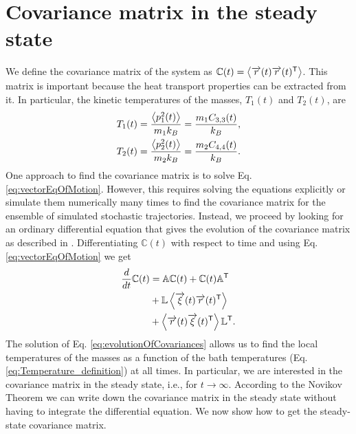 \section{Covariance matrix in the steady state\label{sec:covMatrix}}
%
%
%
%
%
%
We define the covariance matrix of the system as $\mathbb{C}(t) = \expval{\overrightarrow{r}(t)\overrightarrow{r}(t)^\mathsf{T}}$. This matrix is important because the heat transport properties can be extracted from it. In particular, the kinetic temperatures of the masses, $T_1(t)$ and  $T_2(t)$, are
%
\begin{align}
  T_1(t) &= \frac{\expval{ p_1^2(t)}}{m_1 k_B} = \frac{m_1 C_{3,3}(t)}{k_B},
  \nonumber\\
   T_2(t) &= \frac{\expval{ p_2^2(t)}}{m_2 k_B} = \frac{m_2 C_{4,4}(t)}{k_B}.
  \label{eq:Temperature_definition}
\end{align}
%
One approach to find the covariance matrix is to solve Eq. \eqref{eq:vectorEqOfMotion}. However, this requires solving the equations explicitly or simulate them numerically many times to find the covariance matrix for the ensemble of simulated stochastic trajectories. Instead, we proceed by looking for an ordinary differential equation that gives the evolution of the covariance matrix as described in \cite{Sarkka2019,Rieder1967,Casher1971}. Differentiating $\mathbb{C}(t)$ with respect to time and using Eq. \eqref{eq:vectorEqOfMotion} we get
%
\begin{align}
  \frac{d}{dt}\mathbb{C}(t) &=
  \mathbb{A}\mathbb{C}(t) +
  \mathbb{C}(t) \mathbb{A}^\mathsf{T}
  \nonumber\\
  &+
  \mathbb{L}\expval{ \overrightarrow{\xi}(t)\overrightarrow{r}(t)^\mathsf{T}}
  \nonumber\\
  &+
  \expval{ \overrightarrow{r}(t)\overrightarrow{\xi}(t)^\mathsf{T}}\mathbb{L}^\mathsf{T}.
  \label{eq:evolutionOfCovariances}
\end{align}
%
The solution of Eq. \eqref{eq:evolutionOfCovariances} allows us to find the local temperatures of the masses as a function of the bath temperatures (Eq. \eqref{eq:Temperature_definition}) at all times. In particular, we are interested in the covariance matrix in the steady state, i.e., for $t\to \infty$. According to the Novikov Theorem \cite{Novikov1965} we can write down the covariance matrix in the steady state without having to integrate the differential equation. We now show how to get the steady-state covariance matrix.

